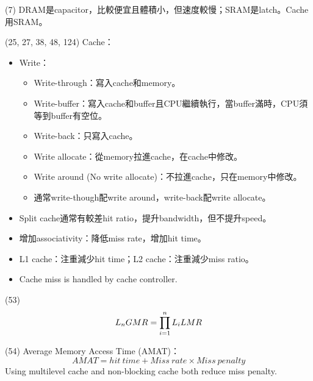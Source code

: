 \item \begin{theorem}{(7)} DRAM是capacitor，比較便宜且體積小，但速度較慢；SRAM是latch。Cache用SRAM。
\end{theorem}

\item \begin{theorem}{(25, 27, 38, 48, 124)} Cache：\begin{itemize}
        \item Write：\begin{itemize}
            \item Write-through：寫入cache和memory。
            \item Write-buffer：寫入cache和buffer且CPU繼續執行，當buffer滿時，CPU須等到buffer有空位。
            \item Write-back：只寫入cache。
            \item Write allocate：從memory拉進cache，在cache中修改。
            \item Write around (No write allocate)：不拉進cache，只在memory中修改。
            \item 通常write-though配write around，write-back配write allocate。
        \end{itemize}
        \item Split cache通常有較差hit ratio，提升bandwidth，但不提升speed。
        \item 增加associativity：降低miss rate，增加hit time。
        \item L1 cache：注重減少hit time；L2 cache：注重減少miss ratio。
        \item Cache miss is handled by cache controller.
    \end{itemize}
\end{theorem}

\item \begin{theorem}{(53)} \begin{equation}
        L_nGMR  = \displaystyle \prod_{i = 1}^{n}L_iLMR   
    \end{equation} 
\end{theorem}

\item \begin{theorem}{(54)} Average Memory Access Time (AMAT)：\begin{equation}
        AMAT = hit \ time + Miss \ rate \times Miss \ penalty   
    \end{equation} Using multilevel cache and non-blocking cache both reduce miss penalty.
\end{theorem}

